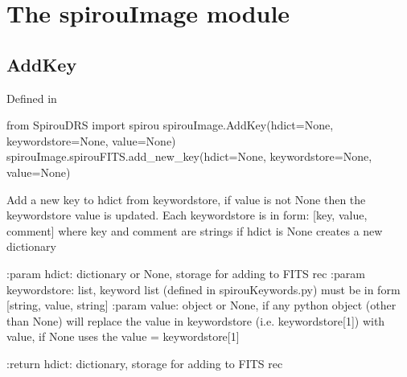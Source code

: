 
\clearpage
\newpage
\begin{minipage}{\textwidth}
\section{The spirouImage module}
\label{ch:the_module:spirouImage}

\subsection{AddKey}

Defined in \spirouImage{}

\begin{pythonbox}
from SpirouDRS import spirou
spirouImage.AddKey(hdict=None, keywordstore=None, value=None)
spirouImage.spirouFITS.add_new_key(hdict=None, keywordstore=None, value=None)
\end{pythonbox}

\begin{pythondocstring}
Add a new key to hdict from keywordstore, if value is not None then the
keywordstore value is updated. Each keywordstore is in form:
        [key, value, comment]    where key and comment are strings
if hdict is None creates a new dictionary

:param hdict: dictionary or None, storage for adding to FITS rec
:param keywordstore: list, keyword list (defined in spirouKeywords.py)
                     must be in form [string, value, string]
:param value: object or None, if any python object (other than None) will
              replace the value in keywordstore (i.e. keywordstore[1]) with
              value, if None uses the value = keywordstore[1]

:return hdict: dictionary, storage for adding to FITS rec
\end{pythondocstring}
\end{minipage}

